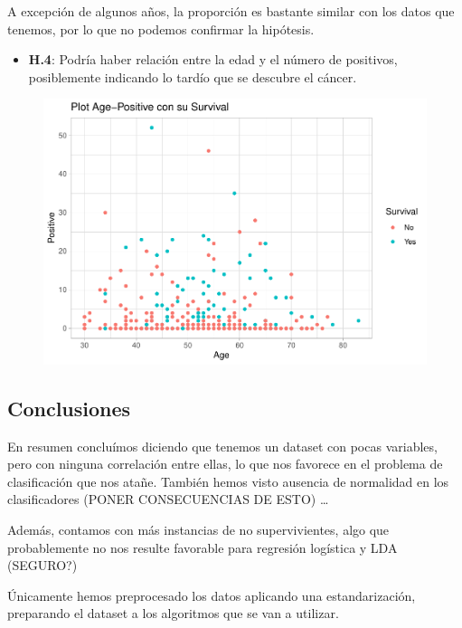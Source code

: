 A excepción de algunos años, la proporción es bastante similar con los datos que tenemos, por lo que no podemos confirmar la hipótesis.

\begin{itemize}
\item \textbf{H.4}: Podría haber relación entre la edad y el número de positivos,
posiblemente indicando lo tardío que se descubre el cáncer.
\end{itemize}

\begin{figure}[H]\includegraphics[width=.9\linewidth]{img/EDA2_files/figure-latex/unnamed-chunk-37-1} \end{figure}

\subsection{Conclusiones}

En resumen concluímos diciendo que tenemos un dataset con pocas variables, pero con ninguna correlación entre ellas, lo que nos favorece en el problema de clasificación que nos atañe. También hemos visto ausencia de normalidad en los clasificadores (PONER CONSECUENCIAS DE
ESTO) \ldots{}

\vspace{\baselineskip}

Además, contamos con más instancias de no supervivientes, algo que probablemente no nos resulte favorable para regresión logística y LDA (SEGURO?)

Únicamente hemos preprocesado los datos aplicando una estandarización, preparando el dataset a los algoritmos que se van a utilizar.